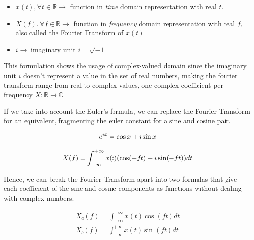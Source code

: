 \documentclass[
  oneside,
  11pt, a4paper,
  footinclude=true,
  headinclude=true,
  cleardoublepage=empty
]{scrbook}
\newcommand{\eqname}[1]{\tag*{#1}}%
\begin{document}
\begin{itemize}
    \item \( x(t), \forall t \in \mathbb{R} \rightarrow \) function in \textit{time} domain representation with real \( t \).
    \item \( X(f), \forall f \in \mathbb{R} \rightarrow \) function in \textit{frequency} domain representation with real \( f \), also called the Fourier Transform of \( x(t) \)
    \item \( i \rightarrow \) imaginary unit \( i = \sqrt{-1} \)
\end{itemize}

This formulation shows the usage of complex-valued domain since the imaginary unit \( i \) doesn't represent a value in the set of real numbers, making the fourier transform range from real to complex values, one complex coefficient per frequency \( X : \mathbb{R} \rightarrow \mathbb{C} \) 

If we take into account the Euler's formula, we can replace the Fourier Transform for an equivalent, fragmenting the euler constant for a sine and cosine pair.

\begin{equation} \label{euler_formula}
    e^{ix} = \cos x + i \sin x \\ %
\end{equation}

\begin{equation}
    X(f) = \int_{-\infty}^{+\infty} x(t) (\cos (-f t) + i \sin (-f t)) dt \\
\end{equation}

Hence, we can break the Fourier Transform apart into two formulas that give each coefficient of the sine and cosine components as functions without dealing with complex numbers.

\begin{equation}
    \begin{split}
        X_{a}(f) = \int_{-\infty}^{+\infty} x(t) \cos (f t) dt \\
        X_{b}(f) = \int_{-\infty}^{+\infty} x(t) \sin (f t) dt \\
    \end{split}
\end{equation}


\end{document}
